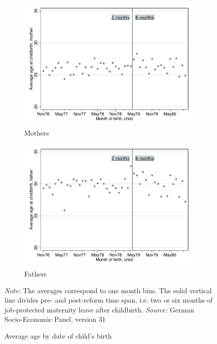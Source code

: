 \documentclass[a4paper ]{article}
\begin{document}
\vspace*{\fill}
\begin{figure}[h]
	\centering
	\begin{subfigure}[h]{0.48\textwidth}
		\centering
		\includegraphics[width=0.99\textwidth]{../../analysis/graphs/SOEP/Magebirth2}
		\caption{Mothers}		
	\end{subfigure}
	\quad
	\begin{subfigure}[h]{0.48\textwidth}
		\centering
		\includegraphics[width=0.99\textwidth]{../../analysis/graphs/SOEP/Fagebirth2}
		\caption{Fathers}
	\end{subfigure}
	\caption{Average age by date of child's birth}\label{fig:age_birth_all cohorts}
	\begin{minipage}{\textwidth} %
{\footnotesize \textit{Note:} The averages correspond to one month bins. The solid vertical line divides pre- and post-reform time span, i.e. two or six months of job-protected maternity leave after childbirth. \newline \textit{Source: }German Socio-Economic Panel, version 31\par}
\end{minipage}
\end{figure}
\end{document}
